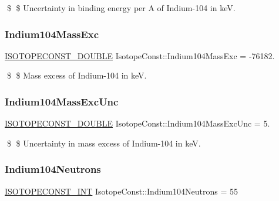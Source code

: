\$ \$ Uncertainty in binding energy per A of Indium-\/104 in keV. \mbox{\label{group___isotope_const-_indium-_in104_ga262fc378358ec083a159dac83b985b1d}} 
\subsubsection{\texorpdfstring{Indium104\+Mass\+Exc}{Indium104MassExc}}
{\footnotesize\ttfamily \mbox{\hyperlink{group___isotope_const-_macros_ga8f45a7272ce02c0b4c65c44636ed719a}{I\+S\+O\+T\+O\+P\+E\+C\+O\+N\+S\+T\+\_\+\+D\+O\+U\+B\+LE}} Isotope\+Const\+::\+Indium104\+Mass\+Exc = -\/76182.}

\$ \$ Mass excess of Indium-\/104 in keV. \mbox{\label{group___isotope_const-_indium-_in104_ga6f5063b7fb4cc7876c79abe324458187}} 
\subsubsection{\texorpdfstring{Indium104\+Mass\+Exc\+Unc}{Indium104MassExcUnc}}
{\footnotesize\ttfamily \mbox{\hyperlink{group___isotope_const-_macros_ga8f45a7272ce02c0b4c65c44636ed719a}{I\+S\+O\+T\+O\+P\+E\+C\+O\+N\+S\+T\+\_\+\+D\+O\+U\+B\+LE}} Isotope\+Const\+::\+Indium104\+Mass\+Exc\+Unc = 5.}

\$ \$ Uncertainty in mass excess of Indium-\/104 in keV. \mbox{\label{group___isotope_const-_indium-_in104_ga67d29549117b51b86f38c4aff9fb7865}} 
\subsubsection{\texorpdfstring{Indium104\+Neutrons}{Indium104Neutrons}}
{\footnotesize\ttfamily \mbox{\hyperlink{group___isotope_const-_macros_ga5f18360b3e99483a35c32d789e62621c}{I\+S\+O\+T\+O\+P\+E\+C\+O\+N\+S\+T\+\_\+\+I\+NT}} Isotope\+Const\+::\+Indium104\+Neutrons = 55}

